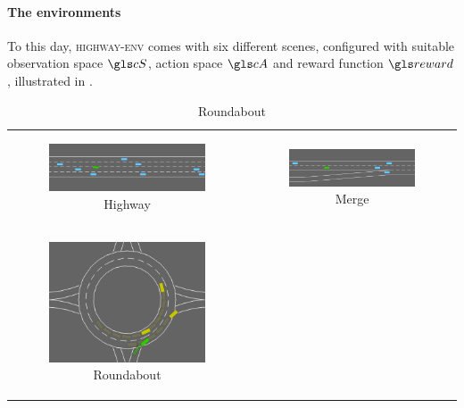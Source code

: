 \paragraph{The environments}

To this day, \textsc{highway-env} comes with six different scenes, configured with suitable observation space $\cS$, action space $\cA$ and reward function $\reward$, illustrated in .

\begin{table}[ht]
	\begin{tabular}{cc}
		\begin{subfigure}{0.49\textwidth}\centering\includegraphics[width=\columnwidth]{img/highway}\caption{Highway}\end{subfigure}&
		\begin{subfigure}{0.49\textwidth}\centering\includegraphics[width=\columnwidth]{img/merge}\caption{Merge}\end{subfigure}\\
		\newline
		\begin{subfigure}{0.49\textwidth}\centering\includegraphics[width=\columnwidth]{img/roundabout}\caption{Roundabout}\end{subfigure}&

\end{tabular}
\end{table}
